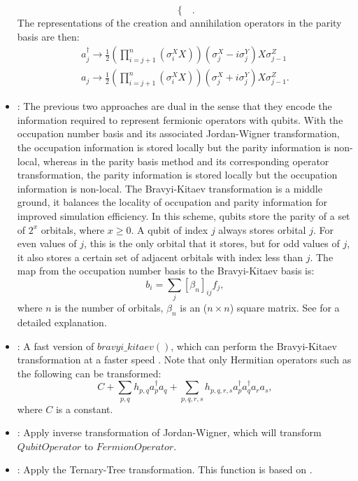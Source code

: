 \begin{itemize}
\begin{equation}
\begin{cases}
              \end{cases}.
          \end{equation}
          The representations of the creation and annihilation operators in the parity basis are then:
          \begin{equation}
              \begin{split}
                  a_j^{\dagger} \to \frac{1}{2} (\prod_{i=j+1}^n ({\sigma}^X_i X))({\sigma}^X_j - i{\sigma}^Y_j) X {\sigma}^Z_{j-1} \\
                  a_j \to \frac{1}{2} (\prod_{i=j+1}^n ({\sigma}^X_i X))({\sigma}^X_j + i{\sigma}^Y_j) X {\sigma}^Z_{j-1}.
              \end{split}
          \end{equation}
    \item \methodbravyikitaev \cite{bravyi2002fermionic, fenwick1994new}: The previous two approaches are dual in the sense that they encode the information required to represent fermionic operators with qubits. With the occupation number basis and its associated Jordan-Wigner transformation, the occupation information is stored locally but the parity information is non-local, whereas in the parity basis method and its corresponding operator transformation, the parity information is stored locally but the occupation information is non-local.
          The Bravyi-Kitaev transformation is a middle ground, it balances the locality of occupation and parity information for improved simulation efficiency. In this scheme, qubits store the parity of a set of $2^x$ orbitals, where $x \geq 0$. A qubit of index $j$ always stores orbital $j$. For even values of $j$, this is the only orbital that it stores, but for odd values of $j$, it also stores a certain set of adjacent orbitals with index less than $j$. The map from the occupation number basis to the Bravyi-Kitaev basis is:
          \begin{equation}
              b_i = \sum_j {[\beta_n]_{ij} f_j},
          \end{equation}
          where $n$ is the number of orbitals, $\beta_n$ is an ($n \times n$) square matrix. See \cite{seeley2012bravyi} for a detailed explanation.
    \item \methodbravyikitaevsuperfast: A fast version of $bravyi\_kitaev()$, which can perform the Bravyi-Kitaev transformation at a faster speed \cite{setia2018bravyi}. Note that only Hermitian operators such as the following can be transformed:
          \begin{equation}
              C + \sum_{p,q} h_{p,q} a_p^{\dagger} a_q + \sum_{p,q,r,s} h_{p,q,r,s} a_p^{\dagger} a_q^{\dagger} a_r a_s,
          \end{equation}
          where $C$ is a constant.
    \item \methodreversedjordanwigner: Apply inverse transformation of Jordan-Wigner, which will transform $QubitOperator$ to $FermionOperator$.
    \item \methodternarytree: Apply the Ternary-Tree transformation. This function is based on \cite{jiang2020optimal}.
\end{itemize}
